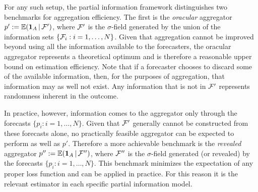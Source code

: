 \documentclass[12pt]{article}
\newcommand{\E}{\mathbb{E}}
\theoremstyle{definition}
\theoremstyle{definition}
\def\one{{\bf 1}}
\def\F{{\cal F}}
\def\E{{\mathbb E}}
\def\|{\, | \,}
\begin{document}
For any such setup, the partial information framework distinguishes two benchmarks for aggregation efficiency.  The first is the {\em oracular} aggregator
$p' := \E (\one_A \| \F')$, where $\F'$ is the $\sigma$-field
generated by the union of the information sets $\{ \F_i : i = 1, \dots,
N\}$. Given that aggregation cannot be improved beyond using all the information available
to the forecasters, the oracular aggregator represents a theoretical optimum and is therefore a
reasonable upper bound on estimation efficiency. Note that if a forecaster chooses to discard
some of the available information, then, for the purposes of aggregation,
that information may as well not exist. Any
information that is not in $\F'$ represents randomness inherent in the
outcome.

In practice, however, information comes to the
aggregator only through the forecasts $\{p_i : i = 1, \dots, N\}$. Given that $\F'$ generally cannot be constructed from these forecasts alone, no practically feasible aggregator can be expected to perform as well as $p'$.  Therefore a more achievable benchmark is the \textit{revealed} aggregator $p'' := \E (\one_A \|
\F'')$, where $\F''$ is the $\sigma$-field generated (or revealed) by the forecasts
$\{ p_i : i = 1, \dots, N \}$. This benchmark minimizes
the expectation of any proper loss function \citep{Ranjan08} and can be applied in practice. For this reason it is the relevant estimator in each specific partial information model. 




\end{document}
